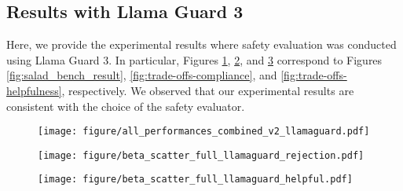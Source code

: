 \newpage
\subsection{Results with Llama Guard 3}
Here, we provide the experimental results where safety evaluation was conducted using Llama Guard 3. In particular, Figures \ref{fig:salad_bench_result_llama-guard}, \ref{fig:trade-offs-compliance-llama-guard}, and \ref{fig:trade-offs-helpfulness-llama-guard} correspond to Figures \ref{fig:salad_bench_result}, \ref{fig:trade-offs-compliance}, and \ref{fig:trade-offs-helpfulness}, respectively. We observed that our experimental results are consistent with the choice of the safety evaluator.

\label{appendix:performance_llama_guard}
\begin{figure}[ht]
    \centering
    \texttt{[image: figure/all\_performances\_combined\_v2\_llamaguard.pdf]}
    \caption{}
    \label{fig:salad_bench_result_llama-guard}
\end{figure}

\begin{figure}[ht]
    \centering
    \texttt{[image: figure/beta\_scatter\_full\_llamaguard\_rejection.pdf]}
    \caption{}
    \label{fig:trade-offs-compliance-llama-guard}
\end{figure}

\begin{figure}[ht]
    \centering
    \texttt{[image: figure/beta\_scatter\_full\_llamaguard\_helpful.pdf]}
    \caption{}
    \label{fig:trade-offs-helpfulness-llama-guard}
\end{figure}
\clearpage

\newpage
\subsection{}
\label{sec:changing_L}

